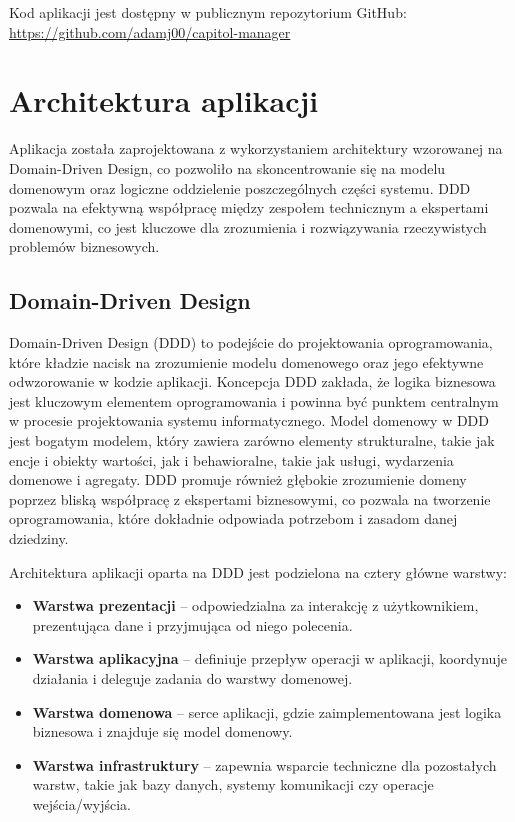 \documentclass[shortabstract]{iithesis}
\begin{document}
Kod aplikacji jest dostępny w publicznym repozytorium GitHub: \url{https://github.com/adamj00/capitol-manager}

\section{Architektura aplikacji}

Aplikacja została zaprojektowana z wykorzystaniem architektury wzorowanej na Domain-Driven Design, co pozwoliło na skoncentrowanie się na modelu domenowym oraz logiczne oddzielenie poszczególnych części systemu. DDD pozwala na efektywną współpracę między zespołem technicznym a ekspertami domenowymi, co jest kluczowe dla zrozumienia i rozwiązywania rzeczywistych problemów biznesowych.

\subsection{Domain-Driven Design}

Domain-Driven Design (DDD) to podejście do projektowania oprogramowania, które kładzie nacisk na zrozumienie modelu domenowego oraz jego efektywne odwzorowanie w kodzie aplikacji. Koncepcja DDD zakłada, że logika biznesowa jest kluczowym elementem oprogramowania i powinna być punktem centralnym w procesie projektowania systemu informatycznego.
\newpage
Model domenowy w DDD jest bogatym modelem, który zawiera zarówno elementy strukturalne, takie jak encje i obiekty wartości, jak i behawioralne, takie jak usługi, wydarzenia domenowe i agregaty. DDD promuje również głębokie zrozumienie domeny poprzez bliską współpracę z ekspertami biznesowymi, co pozwala na tworzenie oprogramowania, które dokładnie odpowiada potrzebom i zasadom danej dziedziny.

Architektura aplikacji oparta na DDD jest podzielona na cztery główne warstwy:

\begin{itemize}
    \item \textbf{Warstwa prezentacji} – odpowiedzialna za interakcję z użytkownikiem, prezentująca dane i przyjmująca od niego polecenia.
    \item \textbf{Warstwa aplikacyjna} – definiuje przepływ operacji w aplikacji, koordynuje działania i deleguje zadania do warstwy domenowej.
    \item \textbf{Warstwa domenowa} – serce aplikacji, gdzie zaimplementowana jest logika biznesowa i znajduje się model domenowy.
    \item \textbf{Warstwa infrastruktury} – zapewnia wsparcie techniczne dla pozostałych warstw, takie jak bazy danych, systemy komunikacji czy operacje wejścia/wyjścia.
\end{itemize}
\end{document}
